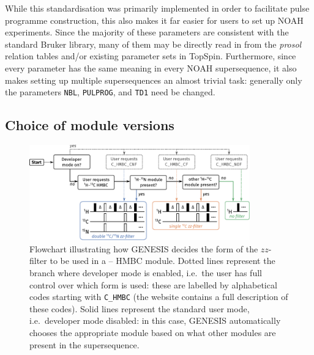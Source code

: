 \documentclass[a4paper,11pt]{article}
\newcommand{\proton}{\ch{^{1}H}}
\newcommand{\carbon}{\ch{^{13}C}}
\newcommand{\HC}{\proton{}--\carbon{}}
\begin{document}
\begin{refsection}
While this standardisation was primarily implemented in order to facilitate pulse programme construction, this also makes it far easier for users to set up NOAH experiments.
Since the majority of these parameters are consistent with the standard Bruker library, many of them may be directly read in from the \textit{prosol} relation tables and/or existing parameter sets in TopSpin.
Furthermore, since every parameter has the same meaning in every NOAH supersequence, it also makes setting up multiple supersequences an almost trivial task: generally only the parameters \texttt{NBL}, \texttt{PULPROG}, and \texttt{TD1} need be changed.


\subsection{Choice of module versions}

\begin{figure}[ht]
    \centering
    \includegraphics[width=0.85\textwidth]{flowchart.pdf}
    \caption{
        Flowchart illustrating how GENESIS decides the form of the \(zz\)-filter to be used in a \HC{} HMBC module.
        Dotted lines represent the branch where developer mode is enabled, i.e.\ the user has full control over which form is used: these are labelled by alphabetical codes starting with \texttt{C\_HMBC} (the website contains a full description of these codes).
        Solid lines represent the standard user mode, i.e.\ developer mode disabled: in this case, GENESIS automatically chooses the appropriate module based on what other modules are present in the supersequence.
    }
    \label{fig:flowchart}
\end{figure}


\end{refsection}
\end{document}
